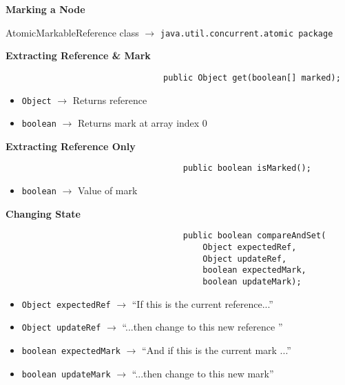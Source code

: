 \par {\large \textbf{Marking a Node}}
\par AtomicMarkableReference class $\rightarrow$ \texttt{java.util.concurrent.atomic package}\\
\begin{center}
\end{center}
%
\clearpage
%
\par {\textbf{Extracting Reference \& Mark}}
\begin{verbatim}
                                public Object get(boolean[] marked);
\end{verbatim}
\begin{itemize}
    \item \texttt{Object} $\rightarrow$ Returns reference
    \item \texttt{boolean} $\rightarrow$ Returns mark at array index 0
\end{itemize}
%
\par {\textbf{Extracting Reference Only}}
\begin{verbatim}
                                    public boolean isMarked();
\end{verbatim}
\begin{itemize}
    \item \texttt{boolean} $\rightarrow$ Value of mark
\end{itemize}
%
\par {\textbf{Changing State}}
\begin{verbatim}
                                    public boolean compareAndSet(
                                        Object expectedRef,
                                        Object updateRef,
                                        boolean expectedMark,
                                        boolean updateMark);
\end{verbatim}
\begin{multicols}{2}
    \begin{itemize}
        \item \texttt{Object expectedRef} $\rightarrow$ \enquote{If this is the current reference...}
        \item \texttt{Object updateRef} $\rightarrow$ \enquote{...then change to this new reference }
        \item \texttt{boolean expectedMark} $\rightarrow$ \enquote{And if this is the current mark ...}
        \item \texttt{boolean updateMark} $\rightarrow$ \enquote{...then change to this new mark}
    \end{itemize}
\end{multicols}
